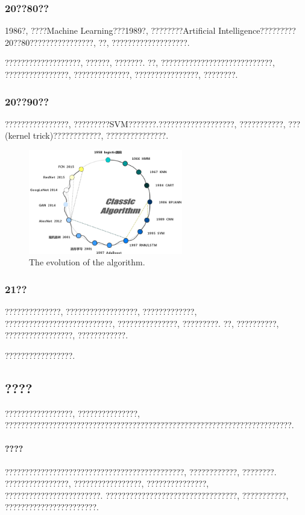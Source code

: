 \documentclass[lang=cn,11pt,a4paper]{elegantpaper}
\begin{document}
\subsubsection*{20??80??}
\par 1986?, ????Machine Learning???1989?, ????????Artificial Intelligence?????????20??80????????????????, ??, ???????????????????.
\par ???????????????????, ??????, ???????. ??, ????????????????????????????, ????????????????, ??????????????, ????????????????, ????????.
\subsubsection*{20??90??}
????????????????, ?????????SVM???????.???????????????????, ???????????, ???(kernel trick)????????????, ???????????????.

\vspace{10pt}
\begin{figure}[htbp]
	\centering
	\includegraphics[width=0.6\textwidth]{SF}
  	\caption{The evolution of the algorithm.\label{fig:SF}}
\end{figure}

\vspace{-20pt}
\subsubsection*{21??}
??????????????, ??????????????????, ?????????????, ???????????????????????????, ???????????????, ?????????. ??, ??????????, ?????????????????, ????????????.
\par {} ?????????????????.
\subsection{????}
\par ?????????????????, ???????????????, ????????????????????????????????????????????????????????????????????????.
\paragraph{????}?????????????????????????????????????????????, ????????????, ????????. ????????????????, ?????????????????, ???????????????, ????????????????????????. ?????????????????????????????????, ???????????, ???????????????????????.
\end{document}
